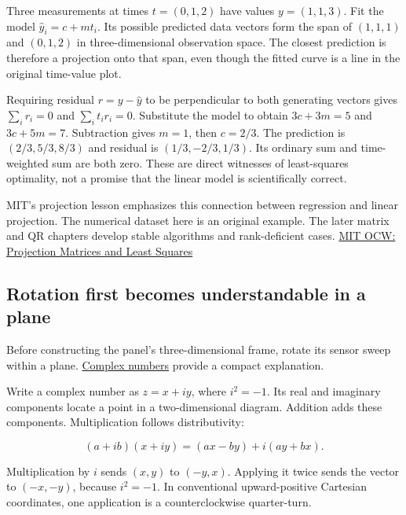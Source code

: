 Three measurements at times \(t=(0,1,2)\) have values \(y=(1,1,3)\). Fit the model \(\widehat y_i=c+mt_i\). Its possible predicted data vectors form the span of \((1,1,1)\) and \((0,1,2)\) in three-dimensional observation space. The closest prediction is therefore a projection onto that span, even though the fitted curve is a line in the original time-value plot.

Requiring residual \(r=y-\widehat y\) to be perpendicular to both generating vectors gives \(\sum_i r_i=0\) and \(\sum_i t_ir_i=0\). Substitute the model to obtain \(3c+3m=5\) and \(3c+5m=7\). Subtraction gives \(m=1\), then \(c=2/3\). The prediction is \((2/3,5/3,8/3)\) and residual is \((1/3,-2/3,1/3)\). Its ordinary sum and time-weighted sum are both zero. These are direct witnesses of least-squares optimality, not a promise that the linear model is scientifically correct.

MIT's projection lesson emphasizes this connection between regression and linear projection. The numerical dataset here is an original example. The later matrix and QR chapters develop stable algorithms and rank-deficient cases. \href{https://www.ocw.mit.edu/courses/18-06sc-linear-algebra-fall-2011/pages/least-squares-determinants-and-eigenvalues/projection-matrices-and-least-squares/}{MIT OCW: Projection Matrices and Least Squares}

\subsection{Rotation first becomes understandable in a plane}\label{01-foundations-i-ch017-rotation-first-becomes-understandable-in-a-plane}

Before constructing the panel's three-dimensional frame, rotate its sensor sweep within a plane. \hyperref[01-foundations-i-ch017-rotation-first-becomes-understandable-in-a-plane]{Complex numbers} provide a compact explanation.

Write a complex number as \(z=x+iy\), where \(i^2=-1\). Its real and imaginary components locate a point in a two-dimensional diagram. Addition adds these components. Multiplication follows distributivity:

\[
(a+ib)(x+iy)=(ax-by)+i(ay+bx).
\]

Multiplication by \(i\) sends \((x,y)\) to \((-y,x)\). Applying it twice sends the vector to \((-x,-y)\), because \(i^2=-1\). In conventional upward-positive Cartesian coordinates, one application is a counterclockwise quarter-turn.

